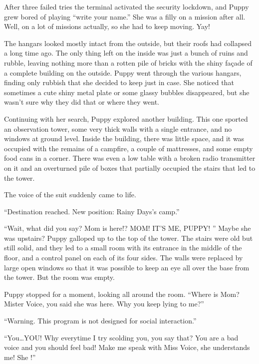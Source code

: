 
After three failed tries the terminal activated the security lockdown, and Puppy grew bored of playing ``write your name.'' She was a filly on a mission after all. Well, on a lot of missions actually, so she had to keep moving. Yay!

The hangars looked mostly intact from the outside, but their roofs had collapsed a long time ago. The only thing left on the inside was just a bunch of ruins and rubble, leaving nothing more than a rotten pile of bricks with the shiny façade of a complete building on the outside. Puppy went through the various hangars, finding only rubbish that she decided to keep just in case. She noticed that sometimes a cute shiny metal plate or some glassy bubbles disappeared, but she wasn't sure why they did that or where they went.

Continuing with her search, Puppy explored another building. This one sported an observation tower, some very thick walls with a single entrance, and no windows at ground level. Inside the building, there was little space, and it was occupied with the remains of a campfire, a couple of mattresses, and some empty food cans in a corner. There was even a low table with a broken radio transmitter on it and an overturned pile of boxes that partially occupied the stairs that led to the tower.

The voice of the suit suddenly came to life.

{\mten ``Destination reached. New position: Rainy Days's camp.''}

``Wait, what did you say? Mom is here!? MOM! IT'S ME, PUPPY! '' Maybe she was upstairs? Puppy galloped up to the top of the tower. The stairs were old but still solid, and they led to a small room with its entrance in the middle of the floor, and a control panel on each of its four sides. The walls were replaced by large open windows so that it was possible to keep an eye all over the base from the tower. But the room was empty.

Puppy stopped for a moment, looking all around the room. ``Where is Mom? Mister Voice, you said she was here. Why you keep lying to me?''

{\mten ``Warning. This program is not designed for social interaction.''}

``You\dots YOU! Why everytime I try scolding you, you say that? You are a bad voice and you should feel bad! Make me speak with Miss Voice, she understands me! She !''

